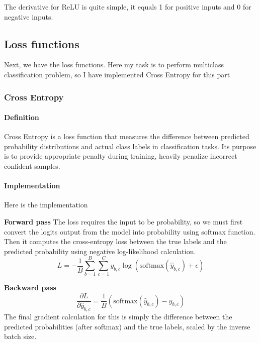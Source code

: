 \documentclass[conference]{IEEEtran}
\begin{document}
The derivative for ReLU is quite simple, it equals 1 for positive inputs and 0 for negative inputs.

\subsection{Loss functions}
Next, we have the loss functions. Here my task is to perform multiclass classification problem, so I have implemented Cross Entropy for this part
\subsubsection{Cross Entropy}
\paragraph{Definition} Cross Entropy is a loss function that measures the difference between predicted probability distributions and actual class labels in classification tasks. Its purpose is to provide appropriate penalty during training, heavily penalize incorrect confident samples.

\paragraph{Implementation} Here is the implementation

\textbf{Forward pass} The loss requires the input to be probability, so we must first convert the logits output from the model into probability using softmax function. Then it computes the cross-entropy loss between the true labels and the predicted probability using negative log-likelihood calculation.
\begin{equation}
L = -\frac{1}{B} \sum_{b=1}^{B} \sum_{c=1}^{C} y_{b,c} \log(\text{softmax}(\hat{y}_{b,c}) + \epsilon)
\end{equation}

\textbf{Backward pass}
\begin{equation}
\frac{\partial L}{\partial \hat{y}_{b,c}} = \frac{1}{B}(\text{softmax}(\hat{y}_{b,c}) - y_{b,c})
\end{equation}
The final gradient calculation for this is simply the difference between the predicted probabilities (after softmax) and the true labels, scaled by the inverse batch size.
\end{document}
